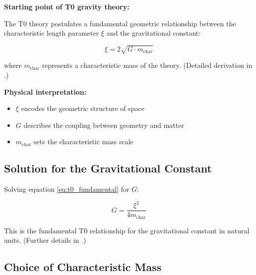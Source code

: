 	\begin{derivation}
		\textbf{Starting point of T0 gravity theory:}
		
		The T0 theory postulates a fundamental geometric relationship between the characteristic length parameter $\xi$ and the gravitational constant:
		
		\begin{equation}
			\xi = 2\sqrt{G \cdot m_{\text{char}}}
			\label{eq:t0_fundamental}
		\end{equation}
		
		where $m_{\text{char}}$ represents a characteristic mass of the theory. (Detailed derivation in \cite{T0_gravitational_constant_En}.)
		
		\textbf{Physical interpretation:}
		\begin{itemize}
			\item $\xi$ encodes the geometric structure of space
			\item $G$ describes the coupling between geometry and matter
			\item $m_{\text{char}}$ sets the characteristic mass scale
		\end{itemize}
	\end{derivation}
	
	\subsection{Solution for the Gravitational Constant}
	
	Solving equation \eqref{eq:t0_fundamental} for $G$:
	
	\begin{equation}
		\boxed{G = \frac{\xi^2}{4 m_{\text{char}}}}
		\label{eq:g_fundamental}
	\end{equation}
	
	This is the fundamental T0 relationship for the gravitational constant in natural units. (Further details in \cite{gravitational_constant_En}.)
	
	\subsection{Choice of Characteristic Mass}
	
